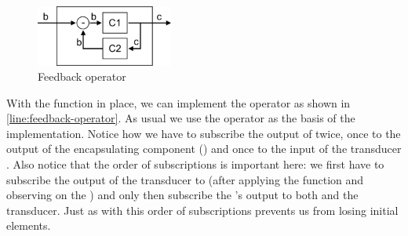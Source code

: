 \begin{figure}[H]
	\begin{center}
		\includegraphics[width=0.4\textwidth]{figures/API-feedback-operator.png}
	\end{center}
	\caption{Feedback operator}
	\label{fig:feedback-operator}
\end{figure}

With the  function in place, we can implement the  operator as shown in  \cref{line:feedback-operator}. As usual we use the  operator as the basis of the implementation. Notice how we have to subscribe the output of  twice, once to the output of the encapsulating component () and once to the input of the transducer . Also notice that the order of subscriptions is important here: we first have to subscribe the output of the transducer to  (after applying the  function and observing on the ) and only then subscribe the 's output to both  and the transducer. Just as with  this order of subscriptions prevents us from losing initial elements.

